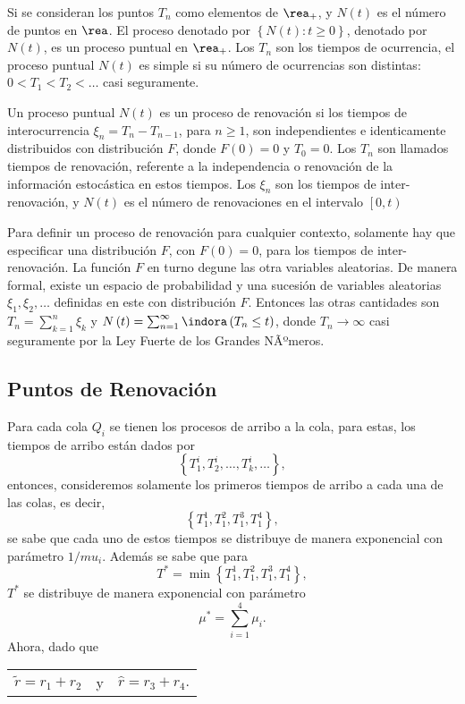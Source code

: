 Si se consideran los puntos $T_{n}$ como elementos de $\rea_{+}$, y $N\left(t\right)$ es el n\'umero de puntos en $\rea$. El proceso denotado por $\left\{N\left(t\right):t\geq0\right\}$, denotado por $N\left(t\right)$, es un proceso puntual en $\rea_{+}$. Los $T_{n}$ son los tiempos de ocurrencia, el proceso puntual $N\left(t\right)$ es simple si su n\'umero de ocurrencias son distintas: $0<T_{1}<T_{2}<\ldots$ casi seguramente.

\begin{Def}
Un proceso puntual $N\left(t\right)$ es un proceso de renovaci\'on si los tiempos de interocurrencia $\xi_{n}=T_{n}-T_{n-1}$, para $n\geq1$, son independientes e identicamente distribuidos con distribuci\'on $F$, donde $F\left(0\right)=0$ y $T_{0}=0$. Los $T_{n}$ son llamados tiempos de renovaci\'on, referente a la independencia o renovaci\'on de la informaci\'on estoc\'astica en estos tiempos. Los $\xi_{n}$ son los tiempos de inter-renovaci\'on, y $N\left(t\right)$ es el n\'umero de renovaciones en el intervalo $\left[0,t\right)$
\end{Def}


\begin{Note}
Para definir un proceso de renovaci\'on para cualquier contexto, solamente hay que especificar una distribuci\'on $F$, con $F\left(0\right)=0$, para los tiempos de inter-renovaci\'on. La funci\'on $F$ en turno degune las otra variables aleatorias. De manera formal, existe un espacio de probabilidad y una sucesi\'on de variables aleatorias $\xi_{1},\xi_{2},\ldots$ definidas en este con distribuci\'on $F$. Entonces las otras cantidades son $T_{n}=\sum_{k=1}^{n}\xi_{k}$ y $N\left(t\right)=\sum_{n=1}^{\infty}\indora\left(T_{n}\leq t\right)$, donde $T_{n}\rightarrow\infty$ casi seguramente por la Ley Fuerte de los Grandes NÃºmeros.
\end{Note}
\subsection{Puntos de Renovaci\'on}

Para cada cola $Q_{i}$ se tienen los procesos de arribo a la cola, para estas, los tiempos de arribo est\'an dados por $$\left\{T_{1}^{i},T_{2}^{i},\ldots,T_{k}^{i},\ldots\right\},$$ entonces, consideremos solamente los primeros tiempos de arribo a cada una de las colas, es decir, $$\left\{T_{1}^{1},T_{1}^{2},T_{1}^{3},T_{1}^{4}\right\},$$ se sabe que cada uno de estos tiempos se distribuye de manera exponencial con par\'ametro $1/mu_{i}$. Adem\'as se sabe que para $$T^{*}=\min\left\{T_{1}^{1},T_{1}^{2},T_{1}^{3},T_{1}^{4}\right\},$$ $T^{*}$ se distribuye de manera exponencial con par\'ametro $$\mu^{*}=\sum_{i=1}^{4}\mu_{i}.$$ Ahora, dado que 
\begin{center}
\begin{tabular}{lcl}
$\tilde{r}=r_{1}+r_{2}$ & y &$\hat{r}=r_{3}+r_{4}.$
\end{tabular}
\end{center}


